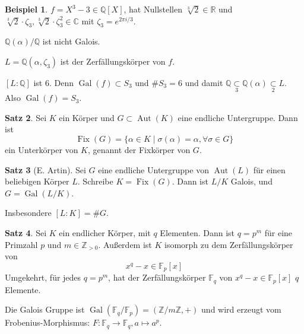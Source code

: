 \documentclass[12pt,parskip=full]{scrartcl}
\newcommand{\setZ}{\mathbb{Z}}
\newcommand{\setQ}{\mathbb{Q}}
\newcommand{\setR}{\mathbb{R}}
\newcommand{\setC}{\mathbb{C}}
\DeclareMathOperator{\Gal}{Gal}
\theoremstyle{definition}
\newtheorem{theorem}{Satz}[section]
\newtheorem{example}[theorem]{Beispiel}
\theoremstyle{remark}
\begin{document}
	\begin{example}
		$f = X^3 - 3 \in \setQ[X]$, hat Nullstellen $\sqrt[3]{2} \in \setR$ und $\sqrt[3]{2} \cdot \zeta_3, \sqrt[3]{2} \cdot \zeta_3^2 \in \setC$ mit $\zeta_3 = e^{2\pi i / 3}$.
		
		$\setQ(\alpha) / \setQ$ ist nicht Galois.
		
		$L = \setQ(\alpha, \zeta_3)$ ist der Zerfällungskörper von $f$.
		
		$[L:\setQ]$ ist $6$. Denn $\Gal(f) \subset S_3$ und $\#S_3 = 6$ und damit $\setQ \underset{3}{\subset} \setQ(\alpha) \underset{2}{\subset} L$. Also $\Gal(f) = S_3$.
	\end{example}

	\begin{theorem}
		Sei $K$ ein Körper und $G \subset \operatorname{Aut}(K)$ eine endliche Untergruppe. Dann ist
		\begin{equation*}
			\operatorname{Fix}(G) = \{ \alpha \in K \mid \sigma(\alpha) = \alpha, \forall \sigma \in G \}
		\end{equation*}
		ein Unterkörper von $K$, genannt der Fixkörper von $G$.
	\end{theorem}

	\begin{theorem}[E. Artin]
		Sei $G$ eine endliche Untergruppe von $\operatorname{Aut}(L)$ für einen beliebigen Körper $L$. Schreibe $K = \operatorname{Fix}(G)$. Dann ist $L/K$ Galois, und $G = \Gal(L/K)$.
		
		Insbesondere $[L:K] = \#G$.
	\end{theorem}

	\begin{theorem}
		Sei $K$ ein endlicher Körper, mit $q$ Elementen. Dann ist $q = p^m$ für eine Primzahl $p$ und $m \in \setZ_{>0}$. Außerdem ist $K$ isomorph zu dem Zerfällungskörper von
		\begin{equation*}
			x^q - x \in \mathbb{F}_p[x]
		\end{equation*}
		Umgekehrt, für jedes $q = p^m$, hat der Zerfällungskörper $\mathbb{F}_q$ von $x^q - x \in \mathbb{F}_p[x]$ $q$ Elemente.
		
		Die Galois Gruppe ist $\Gal(\mathbb{F}_q / \mathbb{F}_p) = (\setZ / m \setZ, +)$ und wird erzeugt vom Frobenius-Morphismus: $F: \mathbb{F}_q \to \mathbb{F}_q, a \mapsto a^p$.
	\end{theorem}
\end{document}
